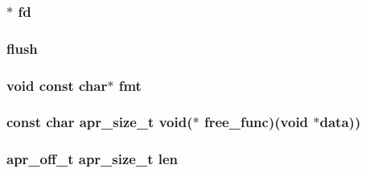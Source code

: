 \subsubsection[{\texorpdfstring{fd}{fd}}]{$\ast$ fd}\hypertarget{group__APR__Util__Bucket__Brigades_gae38fbe4f355ac2094e78a8762aa51d02}{}\label{group__APR__Util__Bucket__Brigades_gae38fbe4f355ac2094e78a8762aa51d02}
\subsubsection[{\texorpdfstring{flush}{flush}}]{ flush}\hypertarget{group__APR__Util__Bucket__Brigades_ga0e45940edc0a96a29eea9b91650341ae}{}\label{group__APR__Util__Bucket__Brigades_ga0e45940edc0a96a29eea9b91650341ae}
\subsubsection[{\texorpdfstring{fmt}{fmt}}]{ {\bf void} const char$\ast$ fmt}\hypertarget{group__APR__Util__Bucket__Brigades_ga8356c67426e3ca8df15ac6756f1fd0a7}{}\label{group__APR__Util__Bucket__Brigades_ga8356c67426e3ca8df15ac6756f1fd0a7}
\subsubsection[{\texorpdfstring{free\+\_\+func}{free_func}}]{\setlength{\rightskip}{0pt plus 5cm}const char {\bf apr\+\_\+size\+\_\+t} {\bf void}($\ast$ free\+\_\+func)({\bf void} $\ast${\bf data}))}\hypertarget{group__APR__Util__Bucket__Brigades_gaa7bea6df1fe699a0c42d676c252b211c}{}\label{group__APR__Util__Bucket__Brigades_gaa7bea6df1fe699a0c42d676c252b211c}
\subsubsection[{\texorpdfstring{len}{len}}]{ {\bf apr\+\_\+off\+\_\+t} {\bf apr\+\_\+size\+\_\+t} len}\hypertarget{group__APR__Util__Bucket__Brigades_ga36f4a31e320c8f18d8691ce72c8dc166}{}\label{group__APR__Util__Bucket__Brigades_ga36f4a31e320c8f18d8691ce72c8dc166}
